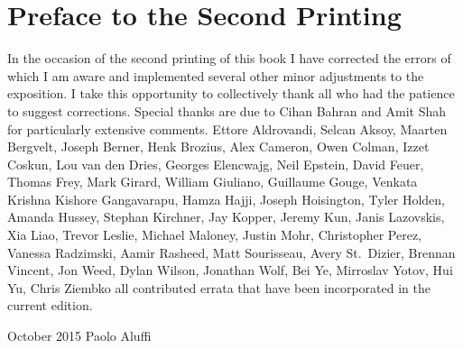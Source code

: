 \chapter*{Preface to the Second Printing}\label{chap:preface}

In the occasion of the second printing of this book I have corrected
the errors of which I am aware and implemented several other minor
adjustments to the exposition. I take this opportunity to collectively
thank all who had the patience to suggest corrections. Special thanks
are due to Cihan Bahran and Amit Shah for particularly extensive
comments. Ettore Aldrovandi, Selcan Aksoy, Maarten Bergvelt, Joseph
Berner, Henk Brozius, Alex Cameron, Owen Colman, Izzet Coskun, Lou van
den Dries, Georges Elencwajg, Neil Epstein, David Feuer, Thomas Frey,
Mark Girard, William Giuliano, Guillaume Gouge, Venkata Krishna
Kishore Gangavarapu, Hamza Hajji, Joseph Hoisington, Tyler Holden,
Amanda Hussey, Stephan Kirchner, Jay Kopper, Jeremy Kun, Janis
Lazovskis, Xia Liao, Trevor Leslie, Michael Maloney, Justin Mohr,
Christopher Perez, Vanessa Radzimski, Aamir Rasheed, Matt Sourisseau,
Avery St.\ Dizier, Brennan Vincent, Jon Weed, Dylan Wilson, Jonathan
Wolf, Bei Ye, Mirroslav Yotov, Hui Yu, Chris Ziembko all contributed
errata that have been incorporated in the current edition.

October 2015 \hfill Paolo Aluffi

